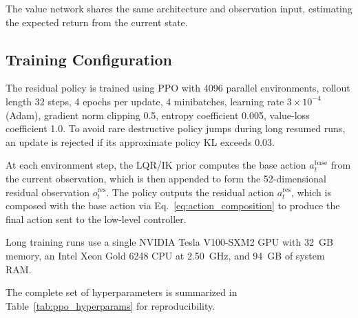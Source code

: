 \documentclass[conference]{IEEEtran}
\begin{document}
The value network shares the same architecture and observation input,
estimating the expected return from the current state.

\subsection{Training Configuration}
The residual policy is trained using PPO with 4096 parallel environments,
rollout length 32 steps, 4 epochs per update, 4 minibatches, learning rate
$3\!\times\!10^{-4}$ (Adam), gradient norm clipping 0.5,
entropy coefficient 0.005, value-loss coefficient 1.0.
To avoid rare destructive policy jumps during long resumed runs, an update is
rejected if its approximate policy KL exceeds 0.03.

At each environment step, the LQR/IK prior computes the base action
$a_t^{\mathrm{base}}$ from the current observation, which is then
appended to form the 52-dimensional residual observation
$o_t^{\mathrm{res}}$. The policy outputs the residual action
$a_t^{\mathrm{res}}$, which is composed with the base action via
Eq.~\eqref{eq:action_composition} to produce the final action sent
to the low-level controller.

Long training runs use a single NVIDIA Tesla V100-SXM2 GPU with
\SI{32}{GB} memory, an Intel Xeon Gold 6248 CPU at \SI{2.50}{GHz},
and \SI{94}{GB} of system RAM.

The complete set of hyperparameters is summarized in
Table~\ref{tab:ppo_hyperparams} for reproducibility.
\end{document}
